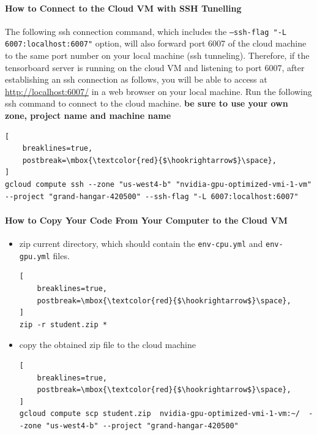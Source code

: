 \paragraph{How to Connect to the Cloud VM with SSH Tunelling}
The following ssh connection command, which includes the \texttt{--ssh-flag "-L 6007:localhost:6007"} option, will also forward port 6007 of the cloud machine to the same port number on your local machine (ssh tunneling). Therefore, if the tensorboard server is running on the cloud VM and listening to port 6007, after establishing an ssh connection as follows, you will be able to access at \href{http://localhost:6007/}{http://localhost:6007/} in a web browser on your local machine.
Run the following ssh command to connect to the cloud machine. \textbf{be sure to use your own zone, project name and machine name}

\begin{lstlisting}[
    breaklines=true,
    postbreak=\mbox{\textcolor{red}{$\hookrightarrow$}\space},
]
gcloud compute ssh --zone "us-west4-b" "nvidia-gpu-optimized-vmi-1-vm" --project "grand-hangar-420500" --ssh-flag "-L 6007:localhost:6007"
\end{lstlisting}



\paragraph{How to Copy Your Code From Your Computer to the Cloud VM}
\begin{itemize}
    \item zip current directory, which should contain the \texttt{env-cpu.yml} and \texttt{env-gpu.yml} files.
\begin{lstlisting}[
    breaklines=true,
    postbreak=\mbox{\textcolor{red}{$\hookrightarrow$}\space},
]
zip -r student.zip *
\end{lstlisting}
    
    \item copy the obtained zip file to the cloud machine
\begin{lstlisting}[
    breaklines=true,
    postbreak=\mbox{\textcolor{red}{$\hookrightarrow$}\space},
]
gcloud compute scp student.zip  nvidia-gpu-optimized-vmi-1-vm:~/  --zone "us-west4-b" --project "grand-hangar-420500" 
\end{lstlisting}

\end{itemize}



